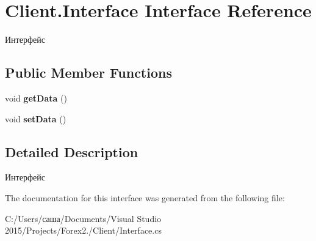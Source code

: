 \hypertarget{interface_client_1_1_interface}{}\section{Client.\+Interface Interface Reference}
\label{interface_client_1_1_interface}


Интерфейс  


\subsection*{Public Member Functions}
\begin{DoxyCompactItemize}
\item 
\hypertarget{interface_client_1_1_interface_ad1c4a8a9032601195bfcbd3fbae45cb2}{}\label{interface_client_1_1_interface_ad1c4a8a9032601195bfcbd3fbae45cb2} 
void {\bfseries get\+Data} ()
\item 
\hypertarget{interface_client_1_1_interface_a20f90fb1316acffc0184159261657dc7}{}\label{interface_client_1_1_interface_a20f90fb1316acffc0184159261657dc7} 
void {\bfseries set\+Data} ()
\end{DoxyCompactItemize}


\subsection{Detailed Description}
Интерфейс 



The documentation for this interface was generated from the following file\+:\begin{DoxyCompactItemize}
\item 
C\+:/\+Users/саша/\+Documents/\+Visual Studio 2015/\+Projects/\+Forex2./\+Client/Interface.\+cs\end{DoxyCompactItemize}
